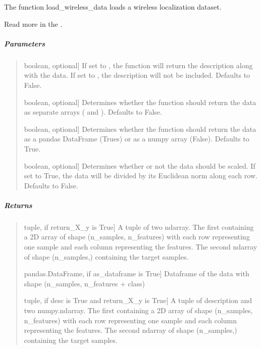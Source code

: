 \documentclass[letterpaper,10pt,english,openany,oneside]{sphinxmanual}
\begin{document}
{{{{\begin{fulllineitems}
\sphinxAtStartPar
The function load\_wireless\_data loads a wireless localization dataset.

\sphinxAtStartPar
Read more in the {\hyperref[\detokenize{user_guide/datasets:datasets}]{}}.


\subparagraph{Parameters}
\label{\detokenize{api_reference/generated/QuadratiK.datasets.load_wireless_data:parameters}}\begin{quote}
\begin{description}
\sphinxlineitem{desc}{[}boolean, optional{]}
\sphinxAtStartPar
If set to , the function will return the description along with the data.
If set to , the description will not be included. Defaults to False.

\sphinxlineitem{return\_X\_y}{[}boolean, optional{]}
\sphinxAtStartPar
Determines whether the function should return the data as separate arrays ( and ).
Defaults to False.

\sphinxlineitem{as\_dataframe}{[}boolean, optional{]}
\sphinxAtStartPar
Determines whether the function should return the data as a pandas DataFrame (Trues)
or as a numpy array (False). Defaults to True.

\sphinxlineitem{scaled}{[}boolean, optional{]}
\sphinxAtStartPar
Determines whether or not the data should be scaled. If set to True, the data will be
divided by its Euclidean norm along each row. Defaults to False.

\end{description}
\end{quote}


\subparagraph{Returns}
\label{\detokenize{api_reference/generated/QuadratiK.datasets.load_wireless_data:returns}}\begin{quote}
\begin{description}
\sphinxlineitem{(data, target)}{[}tuple, if return\_X\_y is True{]}
\sphinxAtStartPar
A tuple of two ndarray. The first containing a 2D array of shape
(n\_samples, n\_features) with each row representing one sample and
each column representing the features. The second ndarray of shape
(n\_samples,) containing the target samples.

\sphinxlineitem{data}{[}pandas.DataFrame, if as\_dataframe is True{]}
\sphinxAtStartPar
Dataframe of the data with shape (n\_samples, n\_features + class)

\sphinxlineitem{(desc, data, target)}{[}tuple, if desc is True and return\_X\_y is True{]}
\sphinxAtStartPar
A tuple of description and two numpy.ndarray. The first containing a 2D
array of shape (n\_samples, n\_features) with each row representing
one sample and each column representing the features. The second
ndarray of shape (n\_samples,) containing the target samples.


\end{description}
\end{quote}
\end{fulllineitems}}}}}
\end{document}
